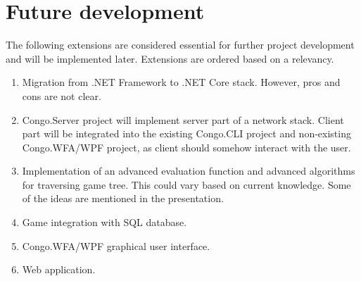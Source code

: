 \section{Future development}

The following extensions are considered essential for further project
development and will be implemented later. Extensions are ordered based
on a relevancy.

\begin{enumerate}
\item Migration from \textsf{.NET Framework} to \textsf{.NET Core} stack.
      However, pros and cons are not clear.
\item \textsf{Congo.Server} project will implement server part of a network
      stack. Client part will be integrated into the existing \textsf{Congo.CLI}
      project and non-existing \textsf{Congo.WFA/WPF} project, as client should
      somehow interact with the user.
\item Implementation of an advanced evaluation function and advanced algorithms for
      traversing game tree. This could vary based on current knowledge. Some
      of the ideas are mentioned in the presentation.
\item Game integration with \textsf{SQL} database.
\item \textsf{Congo.WFA/WPF} graphical user interface.
\item Web application.
\end{enumerate}
